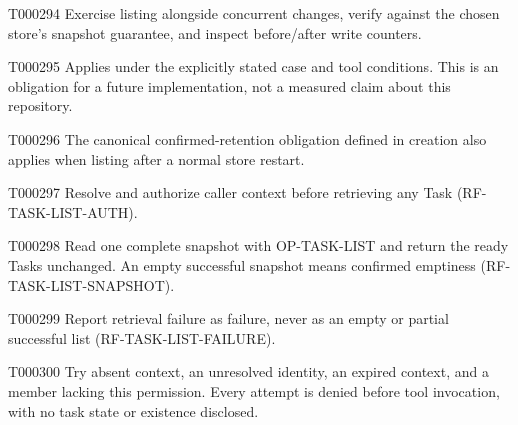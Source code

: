 \documentclass[11pt,a4paper]{article}
\begin{document}
\begin{atlasparagraph}{T000294}
Exercise listing alongside concurrent changes, verify against the chosen store's snapshot guarantee, and inspect before/after write counters.
\end{atlasparagraph}
\begin{atlasparagraph}{T000295}
Applies under the explicitly stated case and tool conditions. This is an obligation for a future implementation, not a measured claim about this repository.
\end{atlasparagraph}
\begin{atlasparagraph}{T000296}
The canonical confirmed-retention obligation defined in creation also applies when listing after a normal store restart.
\end{atlasparagraph}
\begin{atlasparagraph}{T000297}
Resolve and authorize caller context before retrieving any Task (RF-TASK-LIST-AUTH).
\end{atlasparagraph}
\begin{atlasparagraph}{T000298}
Read one complete snapshot with OP-TASK-LIST and return the ready Tasks unchanged. An empty successful snapshot means confirmed emptiness (RF-TASK-LIST-SNAPSHOT).
\end{atlasparagraph}
\begin{atlasparagraph}{T000299}
Report retrieval failure as failure, never as an empty or partial successful list (RF-TASK-LIST-FAILURE).
\end{atlasparagraph}
\begin{atlasparagraph}{T000300}
Try absent context, an unresolved identity, an expired context, and a member lacking this permission. Every attempt is denied before tool invocation, with no task state or existence disclosed.
\end{atlasparagraph}
\end{document}
